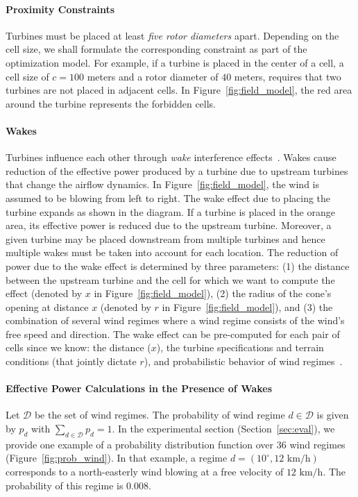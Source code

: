 \documentclass[preprint,12pt]{elsarticle}
\begin{document}
\paragraph{Proximity Constraints}
Turbines must be placed at least \emph{five rotor diameters}
apart. Depending on the cell size, we shall formulate the
corresponding constraint as part of the optimization model. For
example, if a turbine is placed in the center of a
cell, a cell size of $c = 100$ meters and a rotor diameter
of $40$ meters, requires that two turbines are not placed in adjacent cells. In Figure~\ref{fig:field_model}, the red area
around the turbine represents the forbidden cells.
	 
\paragraph{Wakes}
Turbines influence each other through \emph{wake} interference effects~\cite{jensen1983note,shakoor2016wake}.
Wakes cause reduction of the effective power produced by a turbine due
to upstream turbines that change the airflow dynamics. In
Figure~\ref{fig:field_model}, the wind is assumed to be
blowing from left to right. The wake effect due to placing the turbine
expands as shown in the diagram.
If a turbine is placed in the orange area, its effective power is
reduced due to the upstream turbine.
Moreover, a given turbine may be placed downstream from multiple turbines and hence
multiple wakes must be taken into account for each location.  The
reduction of power due to the wake effect is determined by three
parameters: (1) the distance between the upstream turbine and the cell
for which we want to compute the effect (denoted by $x$ in
Figure~\ref{fig:field_model}), (2) the radius of the cone's opening at distance $x$ 
(denoted by $r$ in Figure~\ref{fig:field_model}), and (3) the
combination of several wind regimes where a wind regime consists of 
the wind's free speed and direction.  The wake effect can be pre-computed
for each pair of cells since we know: the distance ($x$), the turbine
specifications and terrain conditions (that jointly dictate $r$), and
probabilistic behavior of wind regimes~\cite{Zhang2014}.
	 
\paragraph{Effective Power Calculations in the Presence of Wakes} 
Let $\mathcal{D}$ be the set of wind regimes.
The probability of wind regime 
$d \in \mathcal{D}$ is given by $p_d$ with $\sum_{d \in \mathcal{D}}^{} p_d = 1$. In the experimental section (Section~\ref{sec:eval}),
we provide one example of a probability distribution 
function over $36$ wind regimes (Figure~\ref{fig:prob_wind}). In that example, 
a regime $d=(10^\circ, 12 \mbox{ km/h})$ corresponds to a north-easterly wind blowing at a free velocity of $12\mbox{ km/h}$. The
probability of this regime is $0.008$.
\end{document}
